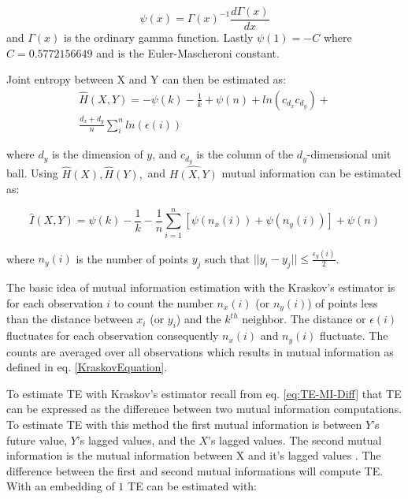 \begin{equation}
\psi(x) = \Gamma(x)^{-1} \frac{d\Gamma(x)} {dx}
\end{equation}
\noindent and  \(\Gamma(x)\) is the ordinary gamma function. Lastly \(\psi(1) = -C\) where \(C=0.5772156649\) and is the Euler-Mascheroni constant. %

Joint entropy between X and Y can then be estimated as:
\setlength{\arraycolsep}{0.0em}
\begin{eqnarray}
\hat{H}(X,Y) = - \psi(k) - \frac{1}{k} + \psi(n) + ln(c_{d_x} c_{d_y})  +  \nonumber\\
\frac{d_x + d_y}{n} \sum^n_i ln(\epsilon(i))
\end{eqnarray}
\setlength{\arraycolsep}{1pt}


\noindent where \(d_y\) is the dimension of \(y\), and \(c_{d_y}\) is the column of the \(d_y\)-dimensional unit ball. Using \(\hat{H}(X), \hat{H}(Y),\) and \(\hat{H(X,Y)}\) mutual information can be estimated as:

\begin{equation}
\label{KraskovEquation}
\hat{I}(X,Y) = \psi(k) - \frac{1}{k} - \frac{1}{n}  \sum_{i=1}^n [\psi(n_x(i)) + \psi(n_y(i))] + \psi(n)
\end{equation}

\noindent where \(n_y(i)\) is the number of points \(y_j\) such that \(|| y_i - y_j || \leq \frac{\epsilon_y(i)}{2} \).

The basic idea of mutual information estimation with the Kraskov's estimator is for each observation \(i\) to count the number \(n_x(i)\) (or \(n_y(i)\)) of points less than the distance between \(x_i\) (or \(y_i\)) and the \(k^{th}\) neighbor. The distance or \(\epsilon(i)\) fluctuates for each observation consequently \(n_x(i)\) and \(n_y(i)\) fluctuate. The counts are averaged over all observations which results in mutual information as defined in eq. \ref{KraskovEquation}.


To estimate TE with Kraskov's estimator recall from eq. \ref{eq:TE-MI-Diff} that TE can be expressed as the difference between two mutual information computations. To estimate TE with this method the first mutual information is between \(Y\)'s future value, \(Y\)'s lagged values, and the  \(X\)'s lagged values. The second mutual information is the mutual information between X and it's lagged values . The difference between the first and second mutual informations will compute TE. With an embedding of \(1\) TE can be estimated with: 

